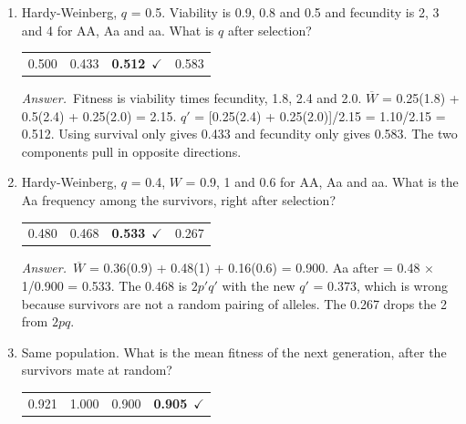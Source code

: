 \documentclass[11pt]{article}
\newcommand{\keyans}[1]{\par\medskip\noindent\textit{Answer.}\ #1\par\medskip}
\begin{document}
\begin{enumerate}[label=\textbf{\arabic*.}, leftmargin=2em, itemsep=1.4em]
\item Hardy-Weinberg, \(q\) = 0.5. Viability is 0.9, 0.8 and 0.5 and fecundity is 2, 3 and 4 for AA, Aa and aa. What is \(q\) after selection?
\nopagebreak\par{}
\par\smallskip\noindent\begin{tabularx}{\linewidth}{@{}YYYY@{}}
0.500 & 0.433 & \textbf{0.512}\ \(\checkmark\) & 0.583 \\
\end{tabularx}
\keyans{Fitness is viability times fecundity, 1.8, 2.4 and 2.0. \(\overline{W}\) = 0.25(1.8) + 0.5(2.4) + 0.25(2.0) = 2.15. \(q'\) = [0.25(2.4) + 0.25(2.0)]/2.15 = 1.10/2.15 = 0.512. Using survival only gives 0.433 and fecundity only gives 0.583. The two components pull in opposite directions.}
\item Hardy-Weinberg, \(q\) = 0.4, \(W\) = 0.9, 1 and 0.6 for AA, Aa and aa. What is the Aa frequency among the survivors, right after selection?
\nopagebreak\par{}
\par\smallskip\noindent\begin{tabularx}{\linewidth}{@{}YYYY@{}}
0.480 & 0.468 & \textbf{0.533}\ \(\checkmark\) & 0.267 \\
\end{tabularx}
\keyans{\(\overline{W}\) = 0.36(0.9) + 0.48(1) + 0.16(0.6) = 0.900. Aa after = 0.48 \(\times\) 1/0.900 = 0.533. The 0.468 is \(2p'q'\) with the new \(q'\) = 0.373, which is wrong because survivors are not a random pairing of alleles. The 0.267 drops the 2 from \(2pq\).}
\item Same population. What is the mean fitness of the next generation, after the survivors mate at random?
\nopagebreak\par{}
\par\smallskip\noindent\begin{tabularx}{\linewidth}{@{}YYYY@{}}
0.921 & 1.000 & 0.900 & \textbf{0.905}\ \(\checkmark\) \\

\end{tabularx}
\end{enumerate}
\end{document}
